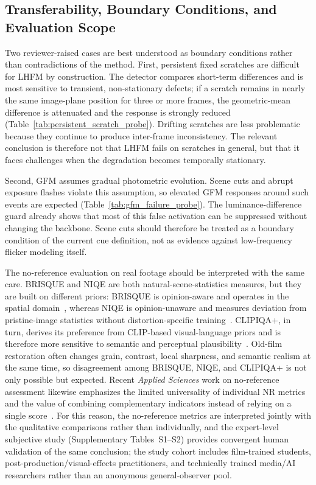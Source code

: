 {\subsection{Transferability, Boundary Conditions, and Evaluation Scope}\label{subsec:transferability}

Two reviewer-raised cases are best understood as boundary conditions rather than contradictions of the method. First, persistent fixed scratches are difficult for LHFM by construction. The detector compares short-term differences and is most sensitive to transient, non-stationary defects; if a scratch remains in nearly the same image-plane position for three or more frames, the geometric-mean difference is attenuated and the response is strongly reduced (Table~\ref{tab:persistent_scratch_probe}). Drifting scratches are less problematic because they continue to produce inter-frame inconsistency. The relevant conclusion is therefore not that LHFM fails on scratches in general, but that it faces challenges when the degradation becomes temporally stationary.

Second, GFM assumes gradual photometric evolution. Scene cuts and abrupt exposure flashes violate this assumption, so elevated GFM responses around such events are expected (Table~\ref{tab:gfm_failure_probe}). The luminance-difference guard already shows that most of this false activation can be suppressed without changing the backbone. Scene cuts should therefore be treated as a boundary condition of the current cue definition, not as evidence against low-frequency flicker modeling itself.

The no-reference evaluation on real footage should be interpreted with the same care. BRISQUE and NIQE are both natural-scene-statistics measures, but they are built on different priors: BRISQUE is opinion-aware and operates in the spatial domain~\cite{mittal2012brisque}, whereas NIQE is opinion-unaware and measures deviation from pristine-image statistics without distortion-specific training~\cite{mittal2013niqe}. CLIPIQA+, in turn, derives its preference from CLIP-based visual-language priors and is therefore more sensitive to semantic and perceptual plausibility~\cite{wang2023clipiqa}. Old-film restoration often changes grain, contrast, local sharpness, and semantic realism at the same time, so disagreement among BRISQUE, NIQE, and CLIPIQA+ is not only possible but expected. Recent \textit{Applied Sciences} work on no-reference assessment likewise emphasizes the limited universality of individual NR metrics and the value of combining complementary indicators instead of relying on a single score~\cite{rubel2022combinednr}. For this reason, the no-reference metrics are interpreted jointly with the qualitative comparisons rather than individually, and the expert-level subjective study (Supplementary Tables~S1--S2) provides convergent human validation of the same conclusion; the study cohort includes film-trained students, post-production/visual-effects practitioners, and technically trained media/AI researchers rather than an anonymous general-observer pool.

}
